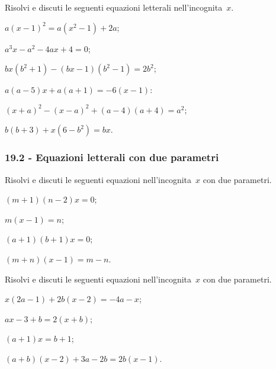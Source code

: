 \begin{esercizio}[\Ast]
\label{ese:19.7}
Risolvi e discuti le seguenti equazioni letterali nell'incognita~$x$.
\begin{multicols}{2}
\begin{enumeratea}
 \item $a(x-1)^{2}=a(x^{2}-1)+2a$;
 \item $a^{3}x-a^{2}-4ax+4=0$;
 \item $bx\left(b^{2}+1\right)-(bx-1)\left(b^{2}-1\right)=2b^{2}$;
 \item $a(a-5)x+a(a+1)=-6(x-1)$:
 \item $(x+a)^{2}-(x-a)^{2}+(a-4)(a+4)=a^{2}$;
 \item $b(b+3)+x\left(6-b^{2}\right)=bx$.
\end{enumeratea}
\end{multicols}
\end{esercizio}
\pagebreak
\subsubsection*{19.2 - Equazioni letterali con due parametri}

\begin{esercizio}[\Ast]
\label{ese:19.8}
Risolvi e discuti le seguenti equazioni nell'incognita~$x$ con due parametri.
\begin{multicols}{2}
\begin{enumeratea}
 \item $(m+1)(n-2)x=0$;
 \item $m(x-1)=n$;
 \item $(a+1)(b+1)x=0$;
 \item $(m+n)(x-1)=m-n$.
\end{enumeratea}
\end{multicols}
\end{esercizio}

\begin{esercizio}[\Ast]
\label{ese:19.9}
Risolvi e discuti le seguenti equazioni nell'incognita~$x$ con due parametri.
\begin{multicols}{2}
\begin{enumeratea}
 \item $x(2a-1)+2b(x-2)=-4a-x$;
 \item $ax-3+b=2(x+b)$;
 \item $(a+1)x=b+1$;
 \item $(a+b)(x-2)+3a-2b=2b(x-1)$.
\end{enumeratea}
\end{multicols}
\end{esercizio}


